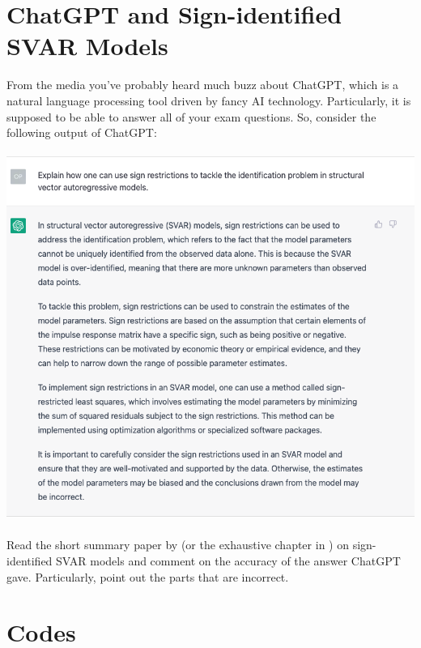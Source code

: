 \documentclass{article}
\begin{document}
\newpage

\section[ChatGPT and Sign-identified SVAR Models]{ChatGPT and Sign-identified SVAR Models\label{ex:ChatGPTSignSVAR}}
From the media you've probably heard much buzz about ChatGPT,
  which is a natural language processing tool driven by fancy AI technology.
Particularly, it is supposed to be able to answer all of your exam questions.
So, consider the following output of ChatGPT:
\\~\\
\includegraphics[width=\textwidth]{../plots/ChatGPTSignRestrictions.png}
~\\
\noindent Read the short summary paper by \textcite{Wolf_2022_WhatCanWe} (or the exhaustive chapter in \textcite[Ch.~13]{Kilian.Lutkepohl_2017_StructuralVectorAutoregressive})
on sign-identified SVAR models and comment on the accuracy of the answer ChatGPT gave.
Particularly, point out the parts that are incorrect.


\newpage


\appendix

\printbibliography
\newpage
\section{Codes}

\end{document}
